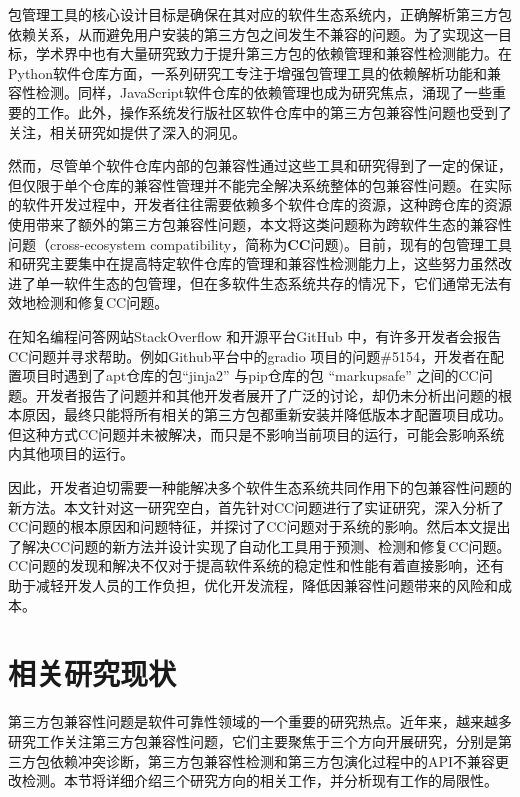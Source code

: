 包管理工具的核心设计目标是确保在其对应的软件生态系统内，正确解析第三方包依赖关系，从而避免用户安装的第三方包之间发生不兼容的问题。为了实现这一目标，学术界中也有大量研究致力于提升第三方包的依赖管理和兼容性检测能力。在Python软件仓库方面，一系列研究工专注于增强包管理工具的依赖解析功能和兼容性检测。同样，JavaScript软件仓库的依赖管理也成为研究焦点，涌现了一些重要的工作。此外，操作系统发行版社区软件仓库中的第三方包兼容性问题也受到了关注，相关研究如提供了深入的洞见。

然而，尽管单个软件仓库内部的包兼容性通过这些工具和研究得到了一定的保证，但仅限于单个仓库的兼容性管理并不能完全解决系统整体的包兼容性问题。在实际的软件开发过程中，开发者往往需要依赖多个软件仓库的资源，这种跨仓库的资源使用带来了额外的第三方包兼容性问题，本文将这类问题称为跨软件生态的兼容性问题（cross-ecosystem compatibility，简称为\textbf{CC}问题)。目前，现有的包管理工具和研究主要集中在提高特定软件仓库的管理和兼容性检测能力上，这些努力虽然改进了单一软件生态的包管理，但在多软件生态系统共存的情况下，它们通常无法有效地检测和修复CC问题。

在知名编程问答网站StackOverflow  和开源平台GitHub 中，有许多开发者会报告CC问题并寻求帮助。例如Github平台中的gradio 项目的问题\#5154，开发者在配置项目时遇到了apt仓库的包“jinja2” 与pip仓库的包 “markupsafe” 之间的CC问题。开发者报告了问题并和其他开发者展开了广泛的讨论，却仍未分析出问题的根本原因，最终只能将所有相关的第三方包都重新安装并降低版本才配置项目成功。但这种方式CC问题并未被解决，而只是不影响当前项目的运行，可能会影响系统内其他项目的运行。

因此，开发者迫切需要一种能解决多个软件生态系统共同作用下的包兼容性问题的新方法。本文针对这一研究空白，首先针对CC问题进行了实证研究，深入分析了CC问题的根本原因和问题特征，并探讨了CC问题对于系统的影响。然后本文提出了解决CC问题的新方法并设计实现了自动化工具用于预测、检测和修复CC问题。CC问题的发现和解决不仅对于提高软件系统的稳定性和性能有着直接影响，还有助于减轻开发人员的工作负担，优化开发流程，降低因兼容性问题带来的风险和成本。


\section{相关研究现状}
第三方包兼容性问题是软件可靠性领域的一个重要的研究热点。近年来，越来越多研究工作关注第三方包兼容性问题，它们主要聚焦于三个方向开展研究，分别是第三方包依赖冲突诊断，第三方包兼容性检测和第三方包演化过程中的API不兼容更改检测。本节将详细介绍三个研究方向的相关工作，并分析现有工作的局限性。
